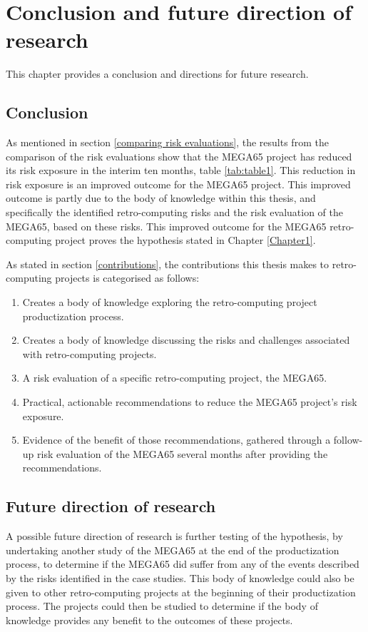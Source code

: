 
\chapter{Conclusion and future direction of research}
\label{Chapter8}
This chapter provides a conclusion and directions for future research.

\section{Conclusion}
As mentioned in section \ref{comparing risk evaluations}, the results from the comparison of the risk evaluations show that the MEGA65 project has reduced its risk exposure in the interim ten months, table \ref{tab:table1}. This reduction in risk exposure is an improved outcome for the MEGA65 project. This improved outcome is partly due to the body of knowledge within this thesis, and specifically the identified retro-computing risks and the risk evaluation of the MEGA65, based on these risks. This improved outcome for the MEGA65 retro-computing project proves the hypothesis stated in Chapter \ref{Chapter1}.

As stated in section \ref{contributions}, the contributions this thesis makes to retro-computing projects is categorised as follows:
\begin{enumerate}
\item Creates a body of knowledge exploring the retro-computing project productization process.
\item Creates a body of knowledge discussing the risks and challenges associated with retro-computing projects.
\item A risk evaluation of a specific retro-computing project, the MEGA65.
\item Practical, actionable recommendations to reduce the MEGA65 project's risk exposure.
\item Evidence of the benefit of those recommendations, gathered through a follow-up risk evaluation of the MEGA65 several months after providing the recommendations.
\end{enumerate}

\section{Future direction of research}
A possible future direction of research is further testing of the hypothesis, by undertaking another study of the MEGA65 at the end of the productization process, to determine if the MEGA65 did suffer from any of the events described by the risks identified in the case studies. This body of knowledge could also be given to other retro-computing projects at the beginning of their productization process. The projects could then be studied to determine if the body of knowledge provides any benefit to the outcomes of these projects.

